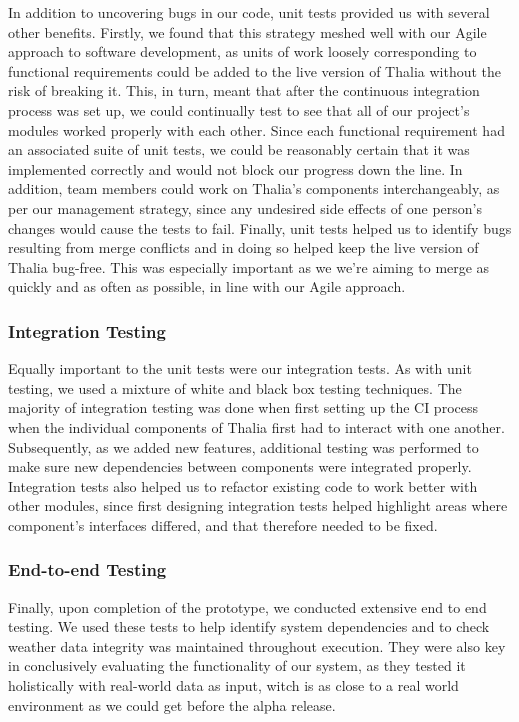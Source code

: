\documentclass[main.tex]{subfiles}
\begin{document}
In addition to uncovering bugs in our code, unit tests provided us with several other benefits. 
Firstly, we found that this strategy meshed well with our Agile approach to software development, as units of work loosely corresponding to functional requirements could be added to the live version of Thalia without the risk of breaking it. This, in turn, meant that after the continuous integration process was set up, we could continually test to see that all of our project's modules worked properly with each other. Since each functional requirement had an associated suite of unit tests, we could be reasonably certain that it was implemented correctly and would not block our progress down the line. 
In addition, team members could work on Thalia’s components interchangeably, as per our management strategy, since any undesired side effects of one person’s changes would cause the tests to fail. 
Finally, unit tests helped us to identify bugs resulting from merge conflicts and in doing so helped keep the live version of Thalia bug-free. This was especially important as we we're aiming to merge as quickly and as often as possible, in line with our Agile approach.

\subsubsection{Integration Testing}
Equally important to the unit tests were our integration tests. As with unit testing, we used a mixture of white and black box testing techniques. The majority of integration testing was done when first setting up the CI process when the individual components of Thalia first had to interact with one another. Subsequently, as we added new features, additional testing was performed to make sure new dependencies between components were integrated properly. Integration tests also helped us to refactor existing code to work better with other modules, since first designing integration tests helped highlight areas where component's interfaces differed, and that therefore needed to be fixed.

\subsubsection{End-to-end Testing}
Finally, upon completion of the prototype, we conducted extensive end to end testing. We used these tests to help identify system dependencies and to check weather data integrity was maintained throughout execution. They were also key in conclusively evaluating the functionality of our system, as they tested it holistically with real-world data as input, witch is as close to a real world environment as we could get before the alpha release.
\end{document}
